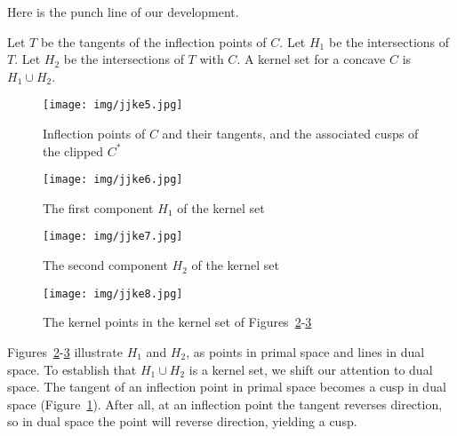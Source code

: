 \documentclass[12pt]{article}
\begin{document}
Here is the punch line of our development.

\begin{theorem}
\label{thm:kernelset}
Let $T$ be the tangents of the inflection points of $C$.
Let $H_1$ be the intersections of $T$.
Let $H_2$ be the intersections of $T$ with $C$.
A kernel set for a concave $C$ is $H_1 \cup H_2$.
\end{theorem}

\clearpage

\begin{figure}
\begin{center}
\texttt{[image: img/jjke5.jpg]}
\end{center}
\caption{Inflection points of $C$ and their tangents, and the associated cusps of the clipped $C^*$}
\label{fig:infl}
\end{figure}

\begin{figure}
\begin{center}
\texttt{[image: img/jjke6.jpg]}
\end{center}
\caption{The first component $H_1$ of the kernel set}
\label{fig:comp1}
\end{figure}

\begin{figure}
\begin{center}
\texttt{[image: img/jjke7.jpg]}
\end{center}
\caption{The second component $H_2$ of the kernel set}
\label{fig:comp2}
\end{figure}

\clearpage

\begin{figure}
\begin{center}
\texttt{[image: img/jjke8.jpg]}
\end{center}
\caption{The kernel points in the kernel set of Figures~\ref{fig:comp1}-\ref{fig:comp2}}
\label{fig:free}
\end{figure}

Figures~\ref{fig:comp1}-\ref{fig:comp2} 
illustrate $H_1$ and $H_2$, as points in primal space
and lines in dual space.
To establish that $H_1 \cup H_2$ is a kernel set,
we shift our attention to dual space.
The tangent of an inflection point in primal space becomes a cusp in dual space
(Figure~\ref{fig:infl}).
After all, at an inflection point the tangent reverses direction,
so in dual space the point will reverse direction, yielding a cusp.
\end{document}
